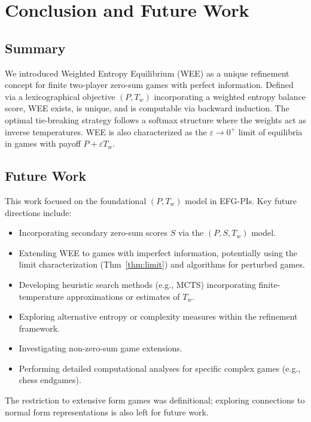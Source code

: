 \documentclass{article}
\begin{document}
\section{Conclusion and Future Work}

\subsection{Summary}
We introduced Weighted Entropy Equilibrium (WEE) as a unique refinement concept for finite two-player zero-sum games with perfect information. Defined via a lexicographical objective $(P, T_w)$ incorporating a weighted entropy balance score, WEE exists, is unique, and is computable via backward induction. The optimal tie-breaking strategy follows a softmax structure where the weights act as inverse temperatures. WEE is also characterized as the $\varepsilon \to 0^+$ limit of equilibria in games with payoff $P + \varepsilon T_w$.

\subsection{Future Work}
This work focused on the foundational $(P, T_w)$ model in EFG-PIs. Key future directions include:
\begin{itemize}
    \item Incorporating secondary zero-sum scores $S$ via the $(P, S, T_w)$ model.
    \item Extending WEE to games with imperfect information, potentially using the limit characterization (Thm~\ref{thm:limit}) and algorithms for perturbed games.
    \item Developing heuristic search methods (e.g., MCTS) incorporating finite-temperature approximations or estimates of $T_w$.
    \item Exploring alternative entropy or complexity measures within the refinement framework.
    \item Investigating non-zero-sum game extensions.
    \item Performing detailed computational analyses for specific complex games (e.g., chess endgames).
\end{itemize}
The restriction to extensive form games was definitional; exploring connections to normal form representations is also left for future work.
\end{document}
